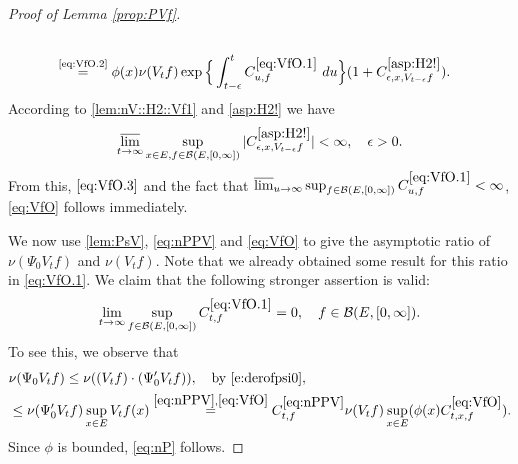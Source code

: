 \documentclass[12pt,a4paper]{amsart}
\numberwithin{equation}{section}
\theoremstyle{plain}
\theoremstyle{definition}
\theoremstyle{remark}
\begin{document}
\begin{proof}[Proof of Lemma \ref{prop:PVf}]
\begin{align}
	\\& \label{eq:VfO.3}\overset{\text{\eqref{eq:VfO.2}}}= \phi(x)\nu(V_{t}f)\exp\Big\{ \int_{t-\epsilon}^t C^{\eqref{eq:VfO.1}}_{u,f} ~du\Big\} (1+C_{\epsilon,x, V_{t-\epsilon} f}^{\eqref{asp:H2!}} ).
\end{align}
	According to \eqref{lem:nV::H2::Vf1}  and \eqref{asp:H2!} we have
\begin{equation}	
	\varlimsup_{t\to \infty}\sup_{x\in E, f\in \mathcal B(E,[0,\infty])}
	|C_{\epsilon,x, V_{t-\epsilon} f}^{\eqref{asp:H2!}}| < \infty, \quad \epsilon > 0.
\end{equation}
	From this, $\eqref{eq:VfO.3}$ and the fact that $\varlimsup_{u\to \infty} \sup_{f\in \mathcal B(E,[0,\infty])} C^{\eqref{eq:VfO.1}}_{u,f}  < \infty$,
	\eqref{eq:VfO} follows immediately.
	
	We now use \eqref{lem:PsV}, \eqref{eq:nPPV} and \eqref{eq:VfO} to give the asymptotic ratio of $\nu(\Psi_0V_tf)$ and $\nu(V_tf)$.
	Note that we already obtained some result for this ratio in \eqref{eq:VfO.1}.
	We claim that the following stronger assertion is valid:
\begin{equation}\label{eq:nP}
	\lim_{t\to \infty}\sup_{f\in \mathcal B(E,[0,\infty])} C^{\eqref{eq:VfO.1}}_{t,f} = 0,
	\quad f\in \mathcal B(E,[0,\infty]).
\end{equation}
	To see this, we observe that
\begin{align}
	&\nu(\Psi_0 V_tf)
	\leq \nu((V_tf)\cdot (\Psi_0' V_tf)) ,\quad\text{by \eqref{e:derofpsi0}},
	\\&  \leq  \nu(\Psi_0' V_tf) \sup_{x\in E}V_tf(x)
	\overset{\eqref{eq:nPPV},\eqref{eq:VfO}}=   C^{\eqref{eq:nPPV}}_{t,f} \nu(V_tf) \sup_{x\in E} (\phi(x) C^{\eqref{eq:VfO}}_{t,x,f}).
\end{align}
	Since $\phi$ is bounded, \eqref{eq:nP} follows.
	

\end{proof}
\end{document}
